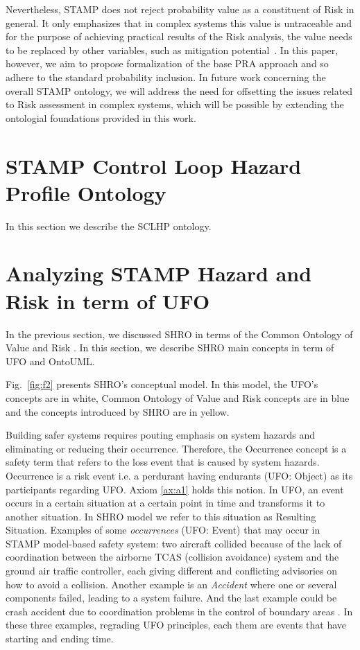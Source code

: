 \documentclass[sw]{iosart2x}
\newcommand{\term}[1]{\textnormal{\textsf{#1}}}
\begin{document}
 Nevertheless, STAMP does not reject probability value as a constituent of Risk in general. It only emphasizes that in complex systems this value is untraceable and for the purpose of achieving practical results of the Risk analysis, the value needs to be replaced by other variables, such as mitigation potential~\cite{Leveson2009}. In this paper, however, we aim to propose formalization of the base PRA approach and so adhere to the standard probability inclusion. In future work concerning the overall STAMP ontology, we will address the need for offsetting the issues related to Risk assessment in complex systems, which will be possible by extending the ontologial foundations provided in this work.


\section{STAMP Control Loop Hazard Profile Ontology}
\label{sec:sclhp}
In this section we describe the SCLHP ontology.

\section{Analyzing STAMP Hazard and Risk in term of UFO}
In the previous section, we discussed SHRO in terms of the Common Ontology of Value and Risk \cite{unknown}. In this section, we describe SHRO main concepts in term of UFO and OntoUML.

Fig.~\ref{fig:f2} presents SHRO's conceptual model. In this model, the UFO's concepts are in white, Common Ontology of Value and Risk concepts are in blue and the concepts introduced by SHRO are in yellow. 

Building safer systems requires pouting emphasis on system hazards and eliminating or reducing their occurrence. Therefore, the \term{Occurrence} concept is a safety term that refers to the loss event that is caused by system hazards. \term{Occurrence} is a risk event i.e. a perdurant having endurants (UFO: Object) as its participants regarding UFO. Axiom \ref{ax:a1} holds this notion. In UFO, an event occurs in a certain situation at a certain point in time and transforms it to another situation. In SHRO model we refer to this situation as \term{Resulting Situation}. Examples of some \emph{occurrences} (UFO: Event) that may occur in STAMP model-based safety system: two aircraft collided because of the lack of coordination between the airborne TCAS (collision avoidance) system and the ground air traffic controller, each giving different and conflicting advisories on how to avoid a collision. Another example is an \emph{Accident} where one or several components failed, leading to a system failure. And the last example could be crash accident due to coordination problems in the control of boundary areas \cite{leveson2012engineering}. In these three examples, regrading UFO principles, each them are events that have starting and ending time.
\end{document}
